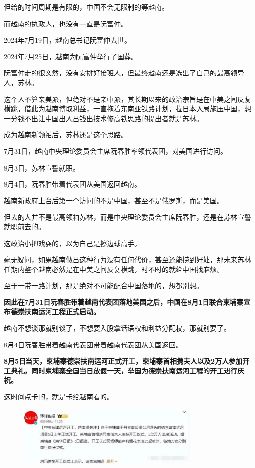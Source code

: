 \documentclass[UTF8, 11pt, oneside]{ctexart}
\newcommand{\zd}[1]{\textbf{\textcolor[RGB]{123,12,0}{#1}}} %
\begin{document}
但给的时间周期是有限的，中国不会无限制的等越南。

而越南的执政人，也没有一直是阮富仲。

2024年7月19日，越南总书记阮富仲去世。

2024年7月25日，越南为阮富仲举行了国葬。

阮富仲走的很突然，没有安排好接班人，但最终越南还是选出了自己的最高领导人，苏林。

这个人不算亲美派，但绝对不是亲中派，其长期以来的政治宗旨是在中美之间反复横跳，借此为越南博取利益，一直拖着东南亚铁路计划，拉日本入局施压中国，想一分钱不出让中国出人出钱出技术修高铁思路的提出者就是苏林。

成为越南新领袖后，苏林还是这个思路。

7月31日，越南中央理论委员会主席阮春胜率领代表团，对美国进行访问。

8月3日，苏林宣誓就职。

8月4日，阮春胜带着代表团从美国返回越南。

越南新政府上台后第一个访问的不是中国，甚至不是俄罗斯，而是美国。

但去的人并不是最高领袖苏林，而是中央理论委员会主席阮春胜，还是在苏林宣誓就职前去的。

这政治小把戏耍的，以为自己是擦边球高手。

毫无疑问，如果越南做出这种行为没有任何代价，甚至还能捞到好处，那未来苏林任期内整个越南必然是在中美之间反复横跳，时不时的就给中国找麻烦。

至于一带一路计划，那是绝对不可能配合中国落地的，想都别想。

\zd{因此在7月31日阮春胜带着越南代表团落地美国之后，中国在8月1日联合柬埔寨宣布德崇扶南运河工程正式启动。}

越南不想谈那就别谈了，不想要入股拿话语权和利益分配权，那就别要了。

8月4日阮春胜带着越南代表团带着越南代表团从美国返回。

\zd{8月5日当天，柬埔寨德崇扶南运河正式开工，柬埔寨首相携夫人以及2万人参加开工典礼，同时柬埔寨全国当日放假一天，举国为德崇扶南运河工程的开工进行庆祝。}

这时间点卡的，就是卡给越南看的。

\begin{figure}[H]
    \centering
    \includegraphics[width=9cm]{2024-08-17-002.jpg}
\end{figure}
\end{document}

